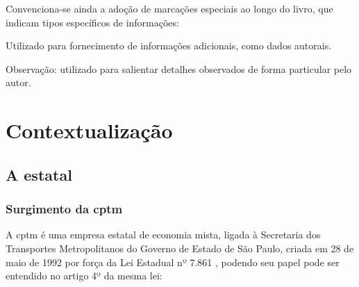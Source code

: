 \documentclass[11pt,fleqn]{book} %
\begin{document}
Convenciona-se ainda a adoção de marcações especiais ao longo do livro, que indicam tipos específicos de informações:

\begin{info}
	Utilizado para fornecimento de informações adicionais, como dados autorais.
\end{info}

\begin{obs}
	Observação: utilizado para salientar detalhes observados de forma particular pelo autor.
\end{obs}


\part{Contextualização}

\chapter{A estatal}

\section{Surgimento da \gls{cptm}}

A \glsdesc*{cptm} é uma empresa estatal de economia mista, ligada à Secretaria dos Transportes Metropolitanos do Governo de Estado de São Paulo, criada em 28 de maio de 1992 por força da Lei Estadual nº 7.861 \cite{sitecptm1}, podendo seu papel pode ser entendido no artigo 4º da mesma lei:
\end{document}
